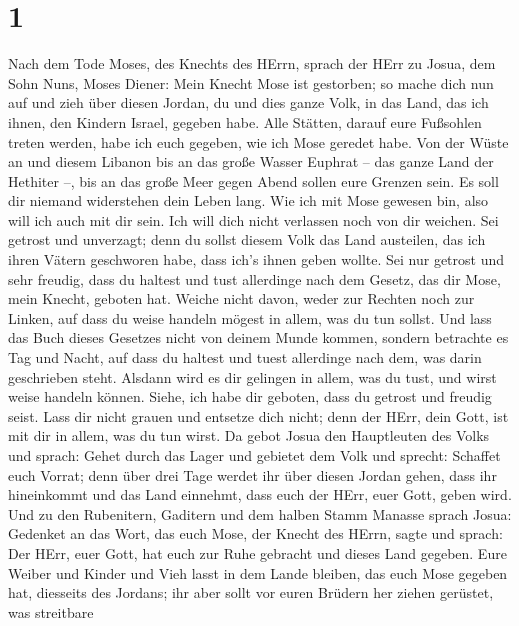 \hypertarget{section}{%
\section{1}\label{section}}

 Nach dem Tode Moses, des Knechts des HErrn, sprach der HErr
zu Josua, dem Sohn Nuns, Moses Diener:  Mein Knecht Mose ist
gestorben; so mache dich nun auf und zieh über diesen Jordan, du und
dies ganze Volk, in das Land, das ich ihnen, den Kindern Israel, gegeben
habe.  Alle Stätten, darauf eure Fußsohlen treten werden,
habe ich euch gegeben, wie ich Mose geredet habe.  Von der
Wüste an und diesem Libanon bis an das große Wasser Euphrat -- das ganze
Land der Hethiter --, bis an das große Meer gegen Abend sollen eure
Grenzen sein.  Es soll dir niemand widerstehen dein Leben
lang. Wie ich mit Mose gewesen bin, also will ich auch mit dir sein. Ich
will dich nicht verlassen noch von dir weichen.  Sei getrost
und unverzagt; denn du sollst diesem Volk das Land austeilen, das ich
ihren Vätern geschworen habe, dass ich's ihnen geben wollte.
 Sei nur getrost und sehr freudig, dass du haltest und tust
allerdinge nach dem Gesetz, das dir Mose, mein Knecht, geboten hat.
Weiche nicht davon, weder zur Rechten noch zur Linken, auf dass du weise
handeln mögest in allem, was du tun sollst.  Und lass das
Buch dieses Gesetzes nicht von deinem Munde kommen, sondern betrachte es
Tag und Nacht, auf dass du haltest und tuest allerdinge nach dem, was
darin geschrieben steht. Alsdann wird es dir gelingen in allem, was du
tust, und wirst weise handeln können.  Siehe, ich habe dir
geboten, dass du getrost und freudig seist. Lass dir nicht grauen und
entsetze dich nicht; denn der HErr, dein Gott, ist mit dir in allem, was
du tun wirst.  Da gebot Josua den Hauptleuten des Volks und
sprach:  Gehet durch das Lager und gebietet dem Volk und
sprecht: Schaffet euch Vorrat; denn über drei Tage werdet ihr über
diesen Jordan gehen, dass ihr hineinkommt und das Land einnehmt, dass
euch der HErr, euer Gott, geben wird.  Und zu den
Rubenitern, Gaditern und dem halben Stamm Manasse sprach Josua:
 Gedenket an das Wort, das euch Mose, der Knecht des HErrn,
sagte und sprach: Der HErr, euer Gott, hat euch zur Ruhe gebracht und
dieses Land gegeben.  Eure Weiber und Kinder und Vieh lasst
in dem Lande bleiben, das euch Mose gegeben hat, diesseits des Jordans;
ihr aber sollt vor euren Brüdern her ziehen gerüstet, was streitbare
